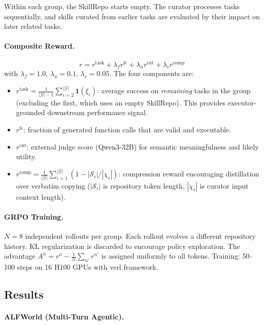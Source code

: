 \documentclass[11pt]{article}
\begin{document}
Within each group, the SkillRepo starts empty. The curator processes tasks sequentially, and skills curated from earlier tasks are evaluated by their impact on later related tasks.

\paragraph{Composite Reward.}
\begin{equation}
    r = r^{\mathrm{task}} + \lambda_f r^{\mathrm{fc}} + \lambda_u r^{\mathrm{cnt}} + \lambda_c r^{\mathrm{comp}}
\end{equation}
with $\lambda_f = 1.0$, $\lambda_u = 0.1$, $\lambda_c = 0.05$. The four components are:

\begin{itemize}
    \item $r^{\mathrm{task}} = \frac{1}{|\mathcal{G}|-1} \sum_{i=2}^{|\mathcal{G}|} \mathbf{1}(\xi_i)$: average success on \emph{remaining} tasks in the group (excluding the first, which uses an empty SkillRepo). This provides executor-grounded downstream performance signal.
    \item $r^{\mathrm{fc}}$: fraction of generated function calls that are valid and executable.
    \item $r^{\mathrm{cnt}}$: external judge score (Qwen3-32B) for semantic meaningfulness and likely utility.
    \item $r^{\mathrm{comp}} = \frac{1}{|\mathcal{G}|} \sum_{i=1}^{|\mathcal{G}|} (1 - |\mathcal{S}_i| / |\chi_i|)$: compression reward encouraging distillation over verbatim copying ($|\mathcal{S}_i|$ is repository token length, $|\chi_i|$ is curator input context length).
\end{itemize}

\paragraph{GRPO Training.}
$N = 8$ independent rollouts per group. Each rollout evolves a different repository history. KL regularization is discarded to encourage policy exploration. The advantage $A^n = r^n - \frac{1}{N}\sum_{n'} r^{n'}$ is assigned uniformly to all tokens. Training: 50--100 steps on 16 H100 GPUs with verl framework.

\subsection{Results}

\paragraph{ALFWorld (Multi-Turn Agentic).}
\end{document}

